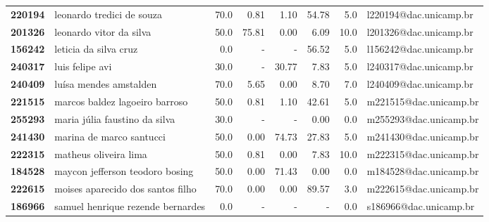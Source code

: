 \documentclass[11pt]{article}
\begin{document}
\begin{center}
\begin{landscape}
\begin{longtable}{llrrrrrl}
\textbf{220194} &             leonardo tredici de souza &                  70.0 &        0.81 &        1.10 &       54.78 &                      5.0 &  l220194@dac.unicamp.br \\
\textbf{201326} &               leonardo vitor da silva &                  50.0 &       75.81 &        0.00 &        6.09 &                     10.0 &  l201326@dac.unicamp.br \\
\textbf{156242} &                 leticia da silva cruz &                   0.0 &           - &           - &       56.52 &                      5.0 &  l156242@dac.unicamp.br \\
\textbf{240317} &                       luis felipe avi &                  30.0 &           - &       30.77 &        7.83 &                      5.0 &  l240317@dac.unicamp.br \\
\textbf{240409} &                luísa mendes amstalden &                  70.0 &        5.65 &        0.00 &        8.70 &                      7.0 &  l240409@dac.unicamp.br \\
\textbf{221515} &        marcos baldez lagoeiro barroso &                  50.0 &        0.81 &        1.10 &       42.61 &                      5.0 &  m221515@dac.unicamp.br \\
\textbf{255293} &         maria júlia faustino da silva &                  30.0 &           - &           - &        0.00 &                      0.0 &  m255293@dac.unicamp.br \\
\textbf{241430} &              marina de marco santucci &                  50.0 &        0.00 &       74.73 &       27.83 &                      5.0 &  m241430@dac.unicamp.br \\
\textbf{222315} &                 matheus oliveira lima &                  50.0 &        0.81 &        0.00 &        7.83 &                     10.0 &  m222315@dac.unicamp.br \\
\textbf{184528} &       maycon jefferson teodoro bosing &                  50.0 &        0.00 &       71.43 &        0.00 &                      0.0 &  m184528@dac.unicamp.br \\
\textbf{222615} &     moises aparecido dos santos filho &                  70.0 &        0.00 &        0.00 &       89.57 &                      3.0 &  m222615@dac.unicamp.br \\
\textbf{186966} &     samuel henrique rezende bernardes &                   0.0 &           - &           - &           - &                      0.0 &  s186966@dac.unicamp.br \\

\end{longtable}
\end{landscape}
\end{center}
\end{document}
